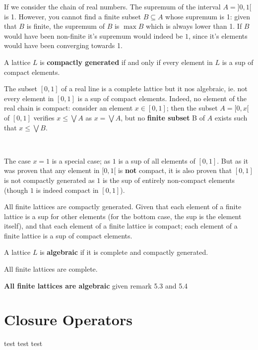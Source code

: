  \begin{example}
	 If we consider the chain of real numbers. The supremum of the interval $A = ]0,1[$ is 1. However, you cannot find a finite subset $B \subseteq A$ whose supremum is 1: given that $B$ is finite, the supremum of $B$ is $\max B$ which is always lower than 1. If $B$ would have been non-finite it's supremum would indeed be $1$, since it's elements would have been converging towards 1.
\end{example}

 \begin{definition}
 	A lattice $L$ is \textbf{compactly generated} if and only if every element in $L$ is a sup of compact elements.
 \end{definition}

 \begin{example}
	 The subset $[0,1]$ of a real line is a complete lattice but it nos algebraic, ie. not every element in $[0,1]$ is a sup of compact elements. Indeed, no element of the real chain is compact: consider an element $x \in [0,1]$; then the subset $A = [0,x[$ of $[0,1]$ verifies $x \leq \bigvee A$ as $x = \bigvee A$, but no \textbf{finite subset} B of $A$ exists such that $x \leq \bigvee B$.

     \

     The case $x=1$ is a special case; as $1$ is a sup of all elements of $[0,1]$. But as it was proven that any element in $[0,1[$ is \textbf{not} compact, it is also proven that $[0,1]$ is not compactly generated as $1$ is the sup of entirely non-compact elements (though $1$ is indeed compact in $[0,1]$).

\end{example}

 \begin{remark}
	 All finite lattices are compactly generated. Given that each element of a finite lattice is a sup for other elements (for the bottom case, the sup is the element itself), and that each element of a finite lattice is compact; each element of a finite lattice is a sup of compact elements.
 \end{remark}

\begin{definition}
	A lattice $L$ is \textbf{algebraic} if it is complete and compactly generated.
\end{definition}

\begin{remark}
	All finite lattices are complete.
\end{remark}

\begin{remark}
	\textbf{All finite lattices are algebraic} given remark 5.3 and 5.4
\end{remark}

\section{Closure Operators}

\begin{note}
	test test test
\end{note}







